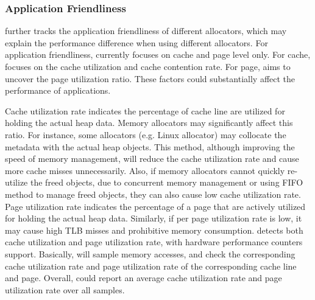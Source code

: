   

\begin{comment}
   the information can be utilized to tell whether an allocator has significant  
As we all know, memory allocators may invoke multiple system calls inside allocation and deallocation. 
User space contention:
How many separate locks are explicitly utilized? 
How many lock acquisitions? How much time are spending on lock waiting for each thread, and in total?

How much time spending on kernel-space contention? For instance, we could infer from memory-related system calls, such as mmap, munmap, madvise, brk, or something else? 

That is, we may have to integrate with SyncPerf for doing this. We will borrow their implementation in order to do this. 
\end{comment}

\subsubsection{Application Friendliness} 
\MP{} further tracks the application friendliness of different allocators, which may explain the performance difference when using different allocators. For application friendliness, \MP{} currently focuses on cache and page level only. For cache, \MP{} focuses on the cache utilization and cache contention rate. For page, \MP{} aims to uncover the page utilization ratio. These factors could substantially affect the performance of applications. 

Cache utilization rate indicates the percentage of cache line are utilized for holding the actual heap data. Memory allocators may significantly affect this ratio. For instance, some allocators (e.g. Linux allocator) may collocate the metadata with the actual heap objects. This method, although improving the speed of memory management, will reduce the cache utilization rate and cause more cache misses unnecessarily. 
Also, if memory allocators cannot quickly re-utilize the freed objects, due to concurrent memory management or using FIFO method to manage freed objects, they can also cause low cache utilization rate. Page utilization rate indicates the percentage of a page that are actively utilized for holding the actual heap data. Similarly, if per page utilization rate is low, it may cause high TLB misses and prohibitive memory consumption. \MP{} detects both cache utilization and page utilization rate, with hardware performance counters support. Basically, \MP{} will sample memory accesses, and check the corresponding cache utilization rate and page utilization rate of the corresponding cache line and page. Overall, \MP{} could report an average cache utilization rate and page utilization rate over all samples. 

